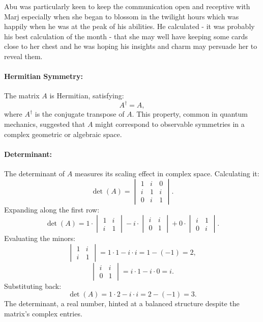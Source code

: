  Abu was particularly keen to keep the communication open and receptive with Marj especially when she began to blossom in the twilight hours which was happily when he was at the peak of his abilities. He calculated - it was probably his best calculation of the month - that she may well have keeping some cards close to her chest and he was hoping his insights and charm may persuade her to reveal them.  

\paragraph{Hermitian Symmetry:} The matrix \(A\) is Hermitian, satisfying:
\[
A^\dagger = A,
\]
where \(A^\dagger\) is the conjugate transpose of \(A\). This property, common in quantum mechanics, suggested that \(A\) might correspond to observable symmetries in a complex geometric or algebraic space.

\paragraph{Determinant:} The determinant of \(A\) measures its scaling effect in complex space. Calculating it:
\[
\det(A) = \begin{vmatrix}
1 & i & 0 \\
i & 1 & i \\
0 & i & 1
\end{vmatrix}.
\]
Expanding along the first row:
\[
\det(A) = 1 \cdot \begin{vmatrix}
1 & i \\
i & 1
\end{vmatrix}
- i \cdot \begin{vmatrix}
i & i \\
0 & 1
\end{vmatrix}
+ 0 \cdot \begin{vmatrix}
i & 1 \\
0 & i
\end{vmatrix}.
\]
Evaluating the minors:
\[
\begin{vmatrix}
1 & i \\
i & 1
\end{vmatrix} = 1 \cdot 1 - i \cdot i = 1 - (-1) = 2,
\]
\[
\begin{vmatrix}
i & i \\
0 & 1
\end{vmatrix} = i \cdot 1 - i \cdot 0 = i.
\]
Substituting back:
\[
\det(A) = 1 \cdot 2 - i \cdot i = 2 - (-1) = 3.
\]
The determinant, a real number, hinted at a balanced structure despite the matrix’s complex entries.

